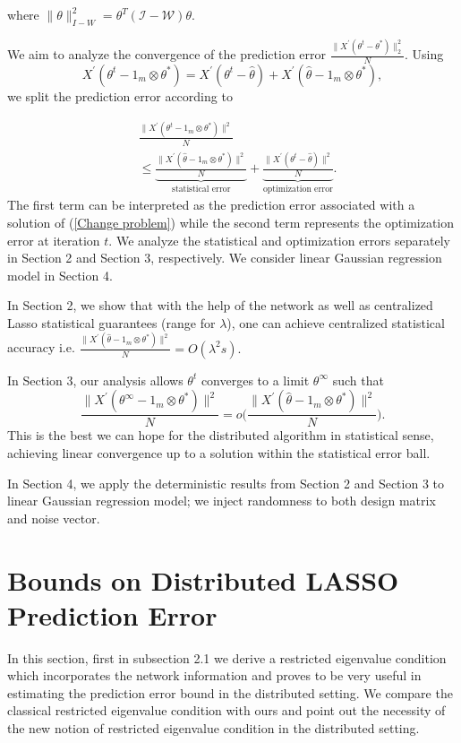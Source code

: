 \documentclass{article}
\theoremstyle{break}
\newcommand{\T}{\theta}
\begin{document}
where $\lVert\T\rVert_{I-W}^2=\T^T(\mathcal{I}-\mathcal{W})\T.$ 

We aim to analyze the convergence of the prediction error $\frac{\lVert X^{'}(\T^t-\T^*)\rVert_2^2}{N}.$ Using
\begin{equation}
    X^{'}(\T^t-1_{m}\otimes\T^*)=X^{'}(\T^t-\hat{\T})+X^{'}(\hat{\T}-1_{m}\otimes\T^*),
\end{equation}
we split the prediction error according to

\begin{align}
    &\frac{\lVert X^{'}(\T^t-1_{m}\otimes\T^*)\rVert^2 }{N}\\
    &\leq\underbrace{\frac{\lVert X^{'}(\hat{\T}-1_{m}\otimes\T^*)\rVert^2}{N}}_{\text{statistical  error}}+\underbrace{\frac{\lVert X^{'}(\T^t-\hat{\T})\rVert^2}{N}}_{\text{optimization  error}}.
\end{align}
The first term can be interpreted as the prediction error associated with a solution of (\ref{Change problem}) while the second term represents the optimization error at iteration $t.$ We analyze the statistical and optimization errors separately in Section 2 and Section 3, respectively. We consider linear Gaussian regression model in Section 4.

In Section 2, we show that with the help of the network as well as centralized Lasso statistical guarantees (range for $\lambda$), one can achieve centralized statistical accuracy i.e. $\frac{\lVert X^{'}(\hat{\T}-1_m\otimes\T^*)\rVert^2}{N}=O(\lambda^2 s).$

In Section 3, our analysis allows $\T^t$  converges to a limit $\T^{\infty}$ such that
\begin{equation}
     \frac{\lVert X^{'}(\T^{\infty}-1_{m}\otimes\T^*)\rVert^2 }{N}=o\bigg(\frac{\lVert X^{'}(\hat{\T}-1_{m}\otimes\T^*)\rVert^2}{N}\bigg).
\end{equation}
This is the best we can hope for the distributed algorithm in statistical sense, achieving linear convergence up to a solution within the statistical error ball.

In Section 4, we apply the deterministic results from Section 2 and Section 3 to linear Gaussian regression model; we inject randomness to both design matrix and noise vector.
\section{Bounds on Distributed LASSO Prediction Error}
In this section, first in subsection 2.1 we derive a restricted eigenvalue condition which incorporates the network information and proves to be very useful in estimating the prediction error bound in the distributed setting. We compare the classical restricted eigenvalue condition with ours and point out the necessity of the new notion of restricted eigenvalue condition in the distributed setting.
\end{document}
